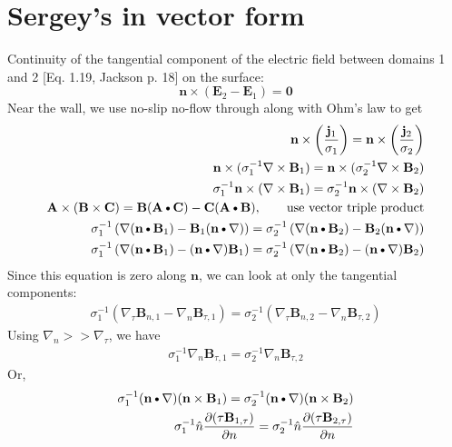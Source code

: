 \documentclass[11pt]{article}
\newcommand{\B}{\mathbf{B}}
\newcommand{\C}{\mathbf{C}}
\newcommand{\curl}{\nabla \times}
\newcommand{\A}{\mathbf{A}}
\newcommand{\PD}{\partial}
\newcommand{\J}{\mathbf{j}}
\newcommand{\E}{\mathbf{E}}
\newcommand{\N}{\mathbf{n}}
\newcommand{\DOT}{\text{\textbullet}}
\begin{document}
\section{Sergey's in vector form}
Continuity of the tangential component of the electric field between domains 1 and 2 [Eq. 1.19, Jackson p. 18] on the surface:
\begin{equation}
  \N \times (\E_2 - \E_1) = \mathbf{0}
\end{equation}
Near the wall, we use no-slip no-flow through along with Ohm's law to get
\begin{equation}\begin{aligned}
\N \times \left( \frac{\J_1}{\sigma_1} \right) = \N \times \left( \frac{\J_2}{\sigma_2} \right) \\
\N \times (\sigma_1^{-1} \curl \B_1 ) = \N \times (\sigma_2^{-1} \curl \B_2 ) \\
\sigma_1^{-1} \N \times (\curl \B_1 ) = \sigma_2^{-1} \N \times (\curl \B_2 ) \\
\A \times (\B \times \C) = \B (\A \DOT \C) - \C (\A \DOT \B), \qquad \text{use vector triple product} \\
\sigma_1^{-1} \left( \nabla (\N \DOT \B_1) - \B_1 (\N \DOT \nabla) \right) = 
\sigma_2^{-1} \left( \nabla (\N \DOT \B_2) - \B_2 (\N \DOT \nabla) \right) \\
\sigma_1^{-1} \left( \nabla (\N \DOT \B_1) - (\N \DOT \nabla) \B_1 \right) = 
\sigma_2^{-1} \left( \nabla (\N \DOT \B_2) - (\N \DOT \nabla) \B_2 \right)
\end{aligned}\end{equation}
Since this equation is zero along $\N$, we can look at only the tangential components:
\begin{equation}\begin{aligned}
\sigma_1^{-1} \left( \nabla_{\tau} \B_{n,1} - \nabla_n \B_{\tau,1} \right) = 
\sigma_2^{-1} \left( \nabla_{\tau} \B_{n,2} - \nabla_n \B_{\tau,2} \right)
\end{aligned}\end{equation}
Using $\nabla_n >> \nabla_{\tau}$, we have
\begin{equation}\begin{aligned}
\sigma_1^{-1} \nabla_n \B_{\tau,1} = 
\sigma_2^{-1} \nabla_n \B_{\tau,2}
\end{aligned}\end{equation}
Or,
\begin{equation}\begin{aligned}
\sigma_1^{-1} (\N \DOT \nabla) (\N \times \B_1) = 
\sigma_2^{-1} (\N \DOT \nabla) (\N \times \B_2) \\
\sigma_1^{-1} \hat{n} \frac{\PD (\tau \B_{1,\tau})}{\PD n} = 
\sigma_2^{-1} \hat{n} \frac{\PD (\tau \B_{2,\tau})}{\PD n}
\end{aligned}\end{equation}
\end{document}
